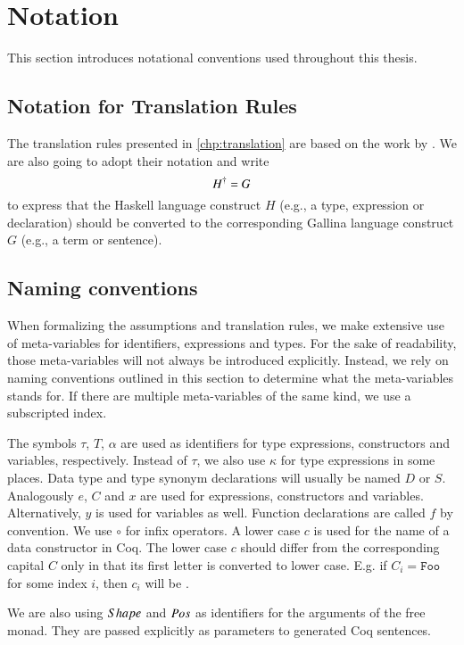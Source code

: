 \section{Notation} \label{sec:preliminaries:notation}
This section introduces notational conventions used throughout this thesis.

\subsection{Notation for Translation Rules}
The translation rules presented in \autoref{chp:translation} are based on the work by \cite{Abel:2005}.
We are also going to adopt their notation and write
\[
  {H}^{\dagger} = G
\]
to express that the Haskell language construct $H$ (e.g., a type, expression or declaration) should be converted to the corresponding Gallina language construct $G$ (e.g., a term or sentence).

\subsection{Naming conventions}
When formalizing the assumptions and translation rules, we make extensive use of meta-variables for identifiers, expressions and types.
For the sake of readability, those meta-variables will not always be introduced explicitly.
Instead, we rely on naming conventions outlined in this section to determine what the meta-variables stands for.
If there are multiple meta-variables of the same kind, we use a subscripted index.

The symbols $\tau$, $T$, $\alpha$ are used as identifiers for type expressions, constructors and variables, respectively.
Instead of $\tau$, we also use $\kappa$ for type expressions in some places.
Data type and type synonym declarations will usually be named $D$ or $S$.
Analogously $e$, $C$ and $x$ are used for expressions, constructors and variables.
Alternatively, $y$ is used for variables as well.
Function declarations are called $f$ by convention.
We use $\circ$ for infix operators.
A lower case $c$ is used for the name of a data constructor in Coq.
The lower case $c$ should differ from the corresponding capital $C$ only in that its first letter is converted to lower case.
E.g. if $C_i = \texttt{Foo}$ for some index $i$, then $c_i$ will be .

We are also using $Shape$ and $Pos$ as identifiers for the arguments of the free monad.
They are passed explicitly as parameters to generated Coq sentences.

